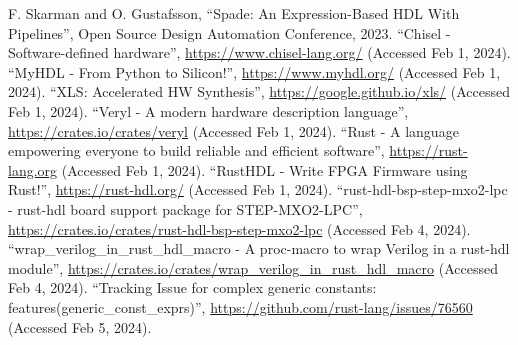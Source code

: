 \documentclass[conference]{IEEEtran}
\begin{document}
\begin{thebibliography}{00}
 F. Skarman and O. Gustafsson, ``Spade: An Expression-Based HDL With Pipelines'', Open Source Design Automation Conference, 2023.
 ``Chisel - Software-defined hardware'', \url{https://www.chisel-lang.org/} (Accessed Feb 1, 2024).
 ``MyHDL - From Python to Silicon!'', \url{https://www.myhdl.org/} (Accessed Feb 1, 2024).
 ``XLS: Accelerated HW Synthesis'', \url{https://google.github.io/xls/} (Accessed Feb 1, 2024).
 ``Veryl - A modern hardware description language'', \url{https://crates.io/crates/veryl} (Accessed Feb 1, 2024).
 ``Rust - A language empowering everyone to build reliable and efficient software'', \url{https://rust-lang.org} (Accessed Feb 1, 2024).
 ``RustHDL - Write FPGA Firmware using Rust!'', \url{https://rust-hdl.org/} (Accessed Feb 1, 2024).
 ``rust-hdl-bsp-step-mxo2-lpc - rust-hdl board support package for STEP-MXO2-LPC'', \url{https://crates.io/crates/rust-hdl-bsp-step-mxo2-lpc} (Accessed Feb 4, 2024).
 ``wrap\_verilog\_in\_rust\_hdl\_macro - A proc-macro to wrap Verilog in a rust-hdl module'', \url{https://crates.io/crates/wrap_verilog_in_rust_hdl_macro} (Accessed Feb 4, 2024).
 ``Tracking Issue for complex generic constants: features(generic\_const\_exprs)'', \url{https://github.com/rust-lang/issues/76560} (Accessed Feb 5, 2024).
\end{thebibliography}
\end{document}
